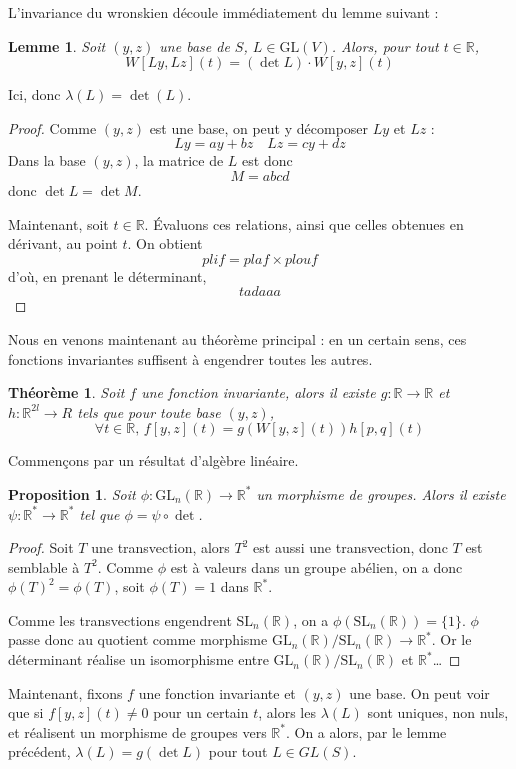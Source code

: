 \documentclass[a4paper, 11pt]{article}
\def\R{\mathbb{R}}
\def\GL{\mathrm{GL}}
\def\SL{\mathrm{SL}}
\newtheorem*{proposition}{Proposition}
\newtheorem*{theorem}{Théorème}
\newtheorem*{lemma}{Lemme}
\begin{document}
L'invariance du wronskien découle immédiatement du lemme suivant :
\begin{lemma}
  Soit $(y, z)$ une base de $S$, $L \in \GL(V)$. Alors, pour tout $t \in \R$,
  \[ W[Ly,Lz](t) = (\det L) \cdot W[y,z](t) \]
\end{lemma}
Ici, donc $\lambda(L) = \det(L)$.
\begin{proof}
  Comme $(y,z)$ est une base, on peut y décomposer $Ly$ et $Lz$ :
  \[ Ly = ay + bz \quad Lz = cy + dz \]
  Dans la base $(y,z)$, la matrice de $L$ est donc
  \[ M = abcd \]
  donc $\det L = \det M$.

  Maintenant, soit $t \in \R$. Évaluons ces relations, ainsi que celles obtenues
  en dérivant, au point $t$. On obtient
  \[ plif = plaf \times plouf \]
  d'où, en prenant le déterminant,
  \[ tadaaa \]
\end{proof}

Nous en venons maintenant au théorème principal : en un certain sens, ces
fonctions invariantes suffisent à engendrer toutes les autres.

\begin{theorem}
  Soit $f$ une fonction invariante, alors il existe $g : \R \to \R$ et $h :
  \R^{2l} \to R$ tels que pour toute base $(y,z)$,
  \[ \forall t \in \R,\, f[y,z](t) = g(W[y,z](t))h[p,q](t) \]
\end{theorem}

Commençons par un résultat d'algèbre linéaire.

\begin{proposition}
  Soit $\phi : \GL_n(\R) \to \R^*$ un morphisme de groupes. Alors il existe
  $\psi : \R^* \to \R^*$ tel que $\phi = \psi \circ \det$.
\end{proposition}
\begin{proof}
  Soit $T$ une transvection, alors $T^2$ est aussi une transvection, donc $T$ est
  semblable à $T^2$. Comme $\phi$ est à valeurs dans un groupe abélien, on a
  donc $\phi(T)^2 = \phi(T)$, soit $\phi(T) = 1$ dans $\R^*$.

  Comme les transvections engendrent $\SL_n(\R)$, on a $\phi(\SL_n(\R)) =
  \{1\}$. $\phi$ passe donc au quotient comme morphisme $\GL_n(\R)/\SL_n(\R) \to
  \R^*$. Or le déterminant réalise un isomorphisme entre $\GL_n(\R)/\SL_n(\R)$
  et $\R^*$…
\end{proof}

Maintenant, fixons $f$ une fonction invariante et $(y,z)$ une base. On peut voir
que si $f[y,z](t) \neq 0$ pour un certain $t$, alors les $\lambda(L)$ sont
uniques, non nuls, et réalisent un morphisme de groupes vers $\R^*$. On a alors,
par le lemme précédent, $\lambda(L) = g(\det L)$ pour tout $L \in GL(S)$.
\end{document}
